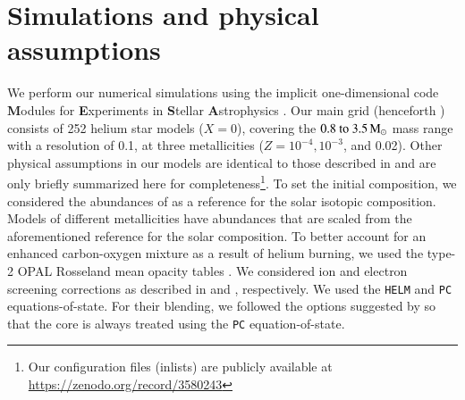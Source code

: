 \documentclass[main.tex]{subfiles}
\begin{document}

\section{Simulations and physical assumptions} \label{sec:ch2:methods}

We perform our numerical simulations using the implicit 
one-dimensional code \textbf{M}odules 
for \textbf{E}xperiments in \textbf{S}tellar 
\textbf{A}strophysics \citep[\mesa\,v10398;][]{Paxton:2010ji,Paxton:2013pj,Paxton:2015jva,Paxton:2017eie}. Our main grid (henceforth \seriesone) consists of 252 
helium star models ($X=0$), covering the $\numrange{0.8}{3.5}\msun$  mass 
range with a resolution of 0.1\msun, at three metallicities 
($Z = 10^{-4}, 10^{-3}$, and 0.02).
Other physical assumptions in our models  are identical to those described in  and are 
only briefly summarized here for completeness\footnote{Our \mesa configuration 
files (inlists) are publicly available at \url{https://zenodo.org/record/3580243}}.
To set the initial composition, we considered the  abundances of \cite{grevesse1998} as a reference for the solar isotopic composition. Models of different metallicities have abundances that are scaled from the aforementioned reference for the solar composition. To better account for an enhanced carbon-oxygen mixture as a result of helium burning, we used the type-2 OPAL Rosseland mean opacity tables \citep{OPAL}. 
 We considered ion and electron screening corrections as described in \cite{PCR2009} and \cite{Itoh2002},  respectively.
We used the  \texttt{HELM} \citep{HELM:eos} and \texttt{PC} \citep{PC:eos} equations-of-state. For their blending,  we followed the options suggested by \cite{Schwab:2017epw} so that the core is always treated using the \texttt{PC}  equation-of-state.
\end{document}
